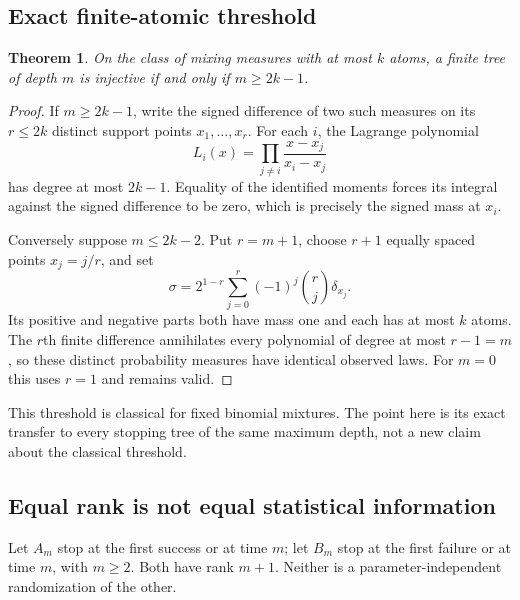 \documentclass[11pt,a4paper]{article}
\newtheorem{theorem}{Theorem}[section]
\theoremstyle{definition}\newtheorem{definition}[theorem]{Definition}
\theoremstyle{remark}\newtheorem{remark}[theorem]{Remark}
\numberwithin{equation}{section}
\begin{document}
\subsection{Exact finite-atomic threshold}\label{M01-sec-5}
\begin{theorem}
On the class of mixing measures with at most $k$ atoms, a finite tree of depth $m$ is injective if and only if $m\ge2k-1$.
\end{theorem}
\begin{proof}
If $m\ge2k-1$, write the signed difference of two such measures on its $r\le2k$ distinct support points $x_1,\ldots,x_r$. For each $i$, the Lagrange polynomial
\[
 L_i(x)=\prod_{j\ne i}\frac{x-x_j}{x_i-x_j}
\]
has degree at most $2k-1$. Equality of the identified moments forces its integral against the signed difference to be zero, which is precisely the signed mass at $x_i$.

Conversely suppose $m\le2k-2$. Put $r=m+1$, choose $r+1$ equally spaced points $x_j=j/r$, and set
\[
 \sigma=2^{1-r}\sum_{j=0}^{r}(-1)^j\binom{r}{j}\delta_{x_j}.
\]
Its positive and negative parts both have mass one and each has at most $k$ atoms. The $r$th finite difference annihilates every polynomial of degree at most $r-1=m$, so these distinct probability measures have identical observed laws. For $m=0$ this uses $r=1$ and remains valid.
\end{proof}
This threshold is classical for fixed binomial mixtures. The point here is its exact transfer to every stopping tree of the same maximum depth, not a new claim about the classical threshold.

\subsection{Equal rank is not equal statistical information}\label{M01-sec-6}
Let $A_m$ stop at the first success or at time $m$; let $B_m$ stop at the first failure or at time $m$, with $m\ge2$. Both have rank $m+1$. Neither is a parameter-independent randomization of the other.
\end{document}
